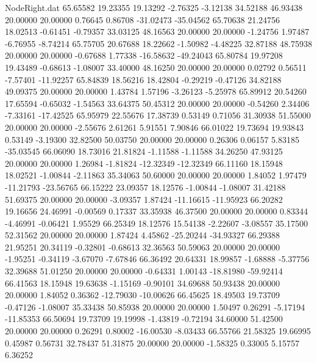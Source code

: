 \begin{filecontents}{NodeRight.dat}
  65.65582   19.23355   19.13292    -2.76325   -3.12138   34.52188   46.93438   20.00000   20.00000    0.76645    0.86708  -31.02473  -35.04562
  65.70638   21.24756   18.02513    -0.61451   -0.79357   33.03125   48.16563   20.00000   20.00000   -1.24756    1.97487   -6.76955   -8.74214
  65.75705   20.67688   18.22662    -1.50982   -4.48225   32.87188   48.75938   20.00000   20.00000   -0.67688    1.77338  -16.58632  -49.24043
  65.80784   19.97208   19.43489    -0.68613   -1.08007   33.40000   48.16250   20.00000   20.00000    0.02792    0.56511   -7.57401  -11.92257
  65.84839   18.56216   18.42804    -0.29219   -0.47126   34.82188   49.09375   20.00000   20.00000    1.43784    1.57196   -3.26123   -5.25978
  65.89912   20.54260   17.65594    -0.65032   -1.54563   33.64375   50.45312   20.00000   20.00000   -0.54260    2.34406   -7.33161  -17.42525
  65.95979   22.55676   17.38739     0.53149    0.71056   31.30938   51.55000   20.00000   20.00000   -2.55676    2.61261    5.91551    7.90846
  66.01022   19.73694   19.93843     0.53149   -3.19300   32.82500   50.03750   20.00000   20.00000    0.26306    0.06157    5.83185  -35.03545
  66.06090   18.73016   21.81824    -1.11588   -1.11588   34.26250   47.93125   20.00000   20.00000    1.26984   -1.81824  -12.32349  -12.32349
  66.11160   18.15948   18.02521    -1.00844   -2.11863   35.34063   50.60000   20.00000   20.00000    1.84052    1.97479  -11.21793  -23.56765
  66.15222   23.09357   18.12576    -1.00844   -1.08007   31.42188   51.69375   20.00000   20.00000   -3.09357    1.87424  -11.16615  -11.95923
  66.20282   19.16656   24.46991    -0.00569    0.17337   33.35938   46.37500   20.00000   20.00000    0.83344   -4.46991   -0.06421    1.95529
  66.25349   18.12576   15.54138    -2.22607   -3.08557   35.17500   52.31562   20.00000   20.00000    1.87424    4.45862  -25.20244  -34.93327
  66.29388   21.95251   20.34119    -0.32801   -0.68613   32.36563   50.59063   20.00000   20.00000   -1.95251   -0.34119   -3.67070   -7.67846
  66.36492   20.64331   18.99857    -1.68888   -5.37756   32.39688   51.01250   20.00000   20.00000   -0.64331    1.00143  -18.81980  -59.92414
  66.41563   18.15948   19.63638    -1.15169   -0.90101   34.69688   50.93438   20.00000   20.00000    1.84052    0.36362  -12.79030  -10.00626
  66.45625   18.49503   19.73709    -0.47126   -1.08007   35.33438   50.85938   20.00000   20.00000    1.50497    0.26291   -5.17194  -11.85353
  66.50694   19.73709   19.19998    -1.43819   -0.72194   34.60000   51.42500   20.00000   20.00000    0.26291    0.80002  -16.00530   -8.03433
  66.55766   21.58325   19.66995     0.45987    0.56731   32.78437   51.31875   20.00000   20.00000   -1.58325    0.33005    5.15757    6.36252

\end{filecontents}
